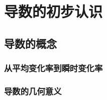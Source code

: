 \chapter{导数的初步认识}\label{导数的初步认识}
\section{导数的概念}
\subsection{从平均变化率到瞬时变化率}
\clearpage
\subsection{导数的几何意义}
\clearpage
